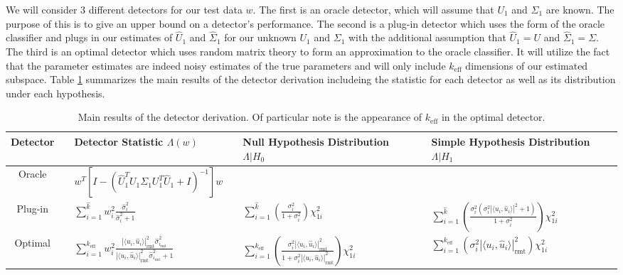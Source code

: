 We will consider 3 different detectors for our test data $w$. The first is an oracle detector, which will assume that $U_1$ and $\Sigma_1$ are known. The purpose of this is to give an upper bound on a detector's performance. The second is a plug-in detector which uses the form of the oracle classifier and plugs in our estimates of $\widehat{U}_1$  and $\widehat{\Sigma}_1$ for our unknown $U_1$ and $\Sigma_1$ with the additional assumption that $\widehat{U}_1 = U$ and $\widehat{\Sigma}_1 = \Sigma$. The third is an optimal detector which uses  random matrix theory to form an approximation to the oracle classifier. It will utilize the fact that the parameter estimates are indeed noisy estimates of the true parameters and will only include $k_\text{eff}$ dimensions of our estimated subspace. Table \ref{table: main results} summarizes the main results of the detector derivation includeing the statistic for each detector as well as its distribution under each hypothesis.

\begin{table}[!ht]
\centering
\begin{tabular}{cclclcl}\toprule
 Detector & \phantom{a} & Detector Statistic $\Lambda(w)$ & \phantom{a} & Null Hypothesis Distribution $\Lambda|H_0$& \phantom{a} & Simple Hypothesis Distribution $\Lambda|H_1$\\
\midrule
Oracle && $ w^T\left[I-\left(\widehat{U}_1^TU_1\Sigma_1U_1^T\widehat{U}_1+I\right)^{-1}\right]w$ &&  && \\
Plug-in && $\sum_{i=1}^{\widehat{k}}w_i^2\frac{\widehat{\sigma}_i^2}{\widehat{\sigma}_i^2+1}$ && $\sum_{i=1}^{\widehat{k}}\left(\frac{\sigma_i^2}{1+\sigma_i^2}\right)\chi^2_{1i}$ && $\sum_{i=1}^{\widehat{k}}\left(\frac{\sigma_i^2\left(\sigma^2_i|\langle u_i,\widehat{u}_i\rangle|^2+1\right)}{1+\sigma_i^2}\right)\chi^2_{1i}$\\
 Optimal&& $\sum_{i=1}^{k_\text{eff}}w_i^2\frac{|\langle u_i,\widehat{u}_i\rangle|^2_{\text{rmt}}\widehat{\sigma}_{i_\text{rmt}}^2}{|\langle u_i,\widehat{u}_i\rangle|^2_{\text{rmt}}\widehat{\sigma}_{i_\text{rmt}}^2 + 1}$ && $\sum_{i=1}^{k_\text{eff}}\left(\frac{\sigma_i^2|\langle u_i,\widehat{u}_i\rangle|^2_{\text{rmt}}}{1+\sigma_i^2|\langle u_i,\widehat{u}_i\rangle|^2_{\text{rmt}}}\right)\chi^2_{1i}$ && $\sum_{i=1}^{k_\text{eff}}\left(\sigma^2_i|\langle u_i,\widehat{u}_i\rangle|^2_{\text{rmt}}\right)\chi^2_{1i}$\\
\bottomrule
\end{tabular}
\caption{Main results of the detector derivation. Of particular note is the appearance of $k_\text{eff}$ in the optimal detector.}
\label{table: main results}
\end{table}

